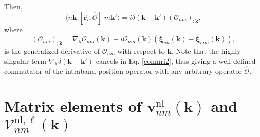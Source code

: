 Then,
\begin{equation}\label{conmri3}
\langle n\mathbf{k}\vert
[\hat{\mathbf{r}}_{i},\hat{\mathcal{O}}]\vert m\mathbf{k}'\rangle
= i\delta(\mathbf{k}-\mathbf{k}')(\mathcal{O}_{nm})_{;\mathbf{k}},
\end{equation}   
where
\begin{equation}\label{gendev}
(\mathcal{O}_{nm})_{;\mathbf{k}}=
\nabla_{\mathbf{k}}\mathcal{O}_{nm}(\mathbf{k}) - i\mathcal{O}_{nm}(\mathbf{k})
\left(
\boldsymbol{\xi}_{nn}(\mathbf{k}) - \boldsymbol{\xi}_{mm}(\mathbf{k})
\right),
\end{equation}  
is the generalized derivative of $\mathcal{O}_{nm}$ with respect to
$\mathbf{k}$. Note that the highly singular term
$\nabla_{\mathbf{k}}\delta(\mathbf{k}-\mathbf{k}')$ cancels in Eq.
\eqref{conmri2}, thus giving a well defined commutator of the intraband position
operator with any arbitrary operator $\hat{\mathcal{O}}$.



\section{Matrix elements of
\texorpdfstring{$\mathbf{v}^\mathrm{nl}_{nm}(\mathbf{k})$}{vnl} and 
\texorpdfstring{$\boldsymbol{\mathcal{V}}^{\mathrm{nl},\ell}_{nm}(\mathbf{k})$}
{calVnl}}
\label{app:vnlme}


